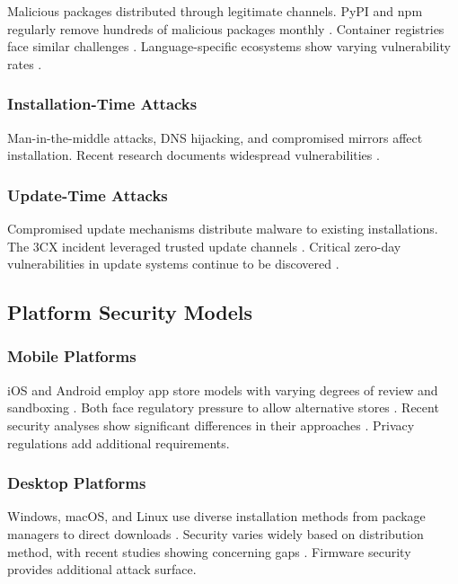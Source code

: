 \documentclass[11pt,a4paper]{article}
\begin{document}
Malicious packages distributed through legitimate channels. PyPI and npm regularly remove hundreds of malicious packages monthly \cite{pypi2023malware,zahan2024packages}. Container registries face similar challenges \cite{wang2023container,docker2024supply}. Language-specific ecosystems show varying vulnerability rates \cite{rustup2024security,golang2024modules}.

\subsubsection{Installation-Time Attacks}

Man-in-the-middle attacks, DNS hijacking, and compromised mirrors affect installation. Recent research documents widespread vulnerabilities \cite{duan2021measuring}.

\subsubsection{Update-Time Attacks}

Compromised update mechanisms distribute malware to existing installations. The 3CX incident leveraged trusted update channels \cite{3cx2023attack}. Critical zero-day vulnerabilities in update systems continue to be discovered \cite{cisco2024vulnerability}.

\subsection{Platform Security Models}

\subsubsection{Mobile Platforms}

iOS and Android employ app store models with varying degrees of review and sandboxing \cite{liu2024ios,chen2023android}. Both face regulatory pressure to allow alternative stores \cite{eu2024dma,uk2024cma,india2024antitrust}. Recent security analyses show significant differences in their approaches \cite{google2024android}. Privacy regulations \cite{gdpr2018,ccpa2020,cpra2023} add additional requirements.

\subsubsection{Desktop Platforms}

Windows, macOS, and Linux use diverse installation methods from package managers to direct downloads \cite{microsoft2024windows,apple2023security,anderson2024linux}. Security varies widely based on distribution method, with recent studies showing concerning gaps \cite{vu2024supplychain}. Firmware security \cite{kallenberg2015uefi,wilkins2024secureboot,nist2024firmware} provides additional attack surface.
\end{document}
